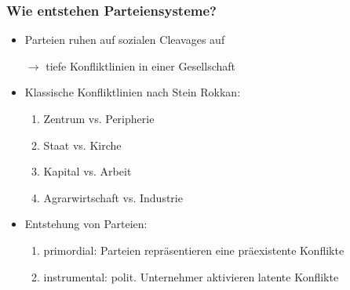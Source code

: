 \documentclass{beamer}
\begin{document}
\begin{frame}
  \frametitle{Wie entstehen Parteiensysteme?}
  \begin{itemize}
    \item Parteien ruhen auf sozialen Cleavages auf
    \item [$\rightarrow$] tiefe Konfliktlinien in einer Gesellschaft
    \item Klassische Konfliktlinien nach Stein Rokkan:
    \begin{enumerate}
      \item Zentrum vs. Peripherie
      \item Staat vs. Kirche
      \item Kapital vs. Arbeit
      \item Agrarwirtschaft vs. Industrie
    \end{enumerate}
    \item Entstehung von Parteien:
    \begin{enumerate}
      \item primordial: Parteien repräsentieren eine präexistente Konflikte
      \item instrumental: polit. Unternehmer aktivieren latente Konflikte
    \end{enumerate}
  \end{itemize}
\end{frame}
\end{document}
